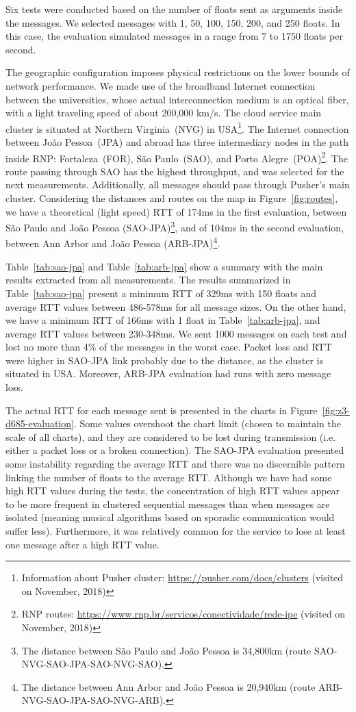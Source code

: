 Six tests were conducted based on the number of floats sent as arguments inside the messages.
We selected messages with 1, 50, 100, 150, 200, and 250 floats.
In this case, the evaluation simulated messages in a range from 7 to 1750 floats per second.

The geographic configuration imposes physical restrictions on the lower bounds of network performance.
We made use of the broadband Internet connection between the universities, whose actual interconnection medium is an optical fiber, with a light traveling speed of about 200,000 km/s.
The cloud service main cluster is situated at Northern Virginia~(NVG) in USA\footnote{Information about Pusher cluster: \url{https://pusher.com/docs/clusters} (visited on November, 2018)}.
The Internet connection between Jo\~{a}o Pessoa~(JPA) and abroad has three intermediary nodes in the path inside RNP: Fortaleza~(FOR), S\~{a}o Paulo~(SAO), and Porto Alegre~(POA)\footnote{RNP routes: \url{https://www.rnp.br/servicos/conectividade/rede-ipe} (visited on November, 2018)}.
The route passing through SAO has the highest throughput, and was selected for the next measurements.
Additionally, all messages should pass through Pusher's main cluster.
Considering the distances and routes on the map in Figure~\ref{fig:routes}, we have a theoretical (light speed) RTT of 174ms in the first evaluation, between S\~{a}o Paulo and Jo\~{a}o Pessoa (SAO-JPA)\footnote{The distance between S\~{a}o Paulo and Jo\~{a}o Pessoa is 34,800km (route SAO-NVG-SAO-JPA-SAO-NVG-SAO).}, and of 104ms in the second evaluation, between Ann Arbor and Jo\~{a}o Pessoa (ARB-JPA)\footnote{The distance between Ann Arbor and Jo\~{a}o Pessoa is 20,940km (route ARB-NVG-SAO-JPA-SAO-NVG-ARB).}.

Table~\ref{tab:sao-jpa} and Table~\ref{tab:arb-jpa} show a summary with the main results extracted from all measurements.
The results summarized in Table~\ref{tab:sao-jpa} present a minimum RTT of 329ms with 150 floats and average RTT values between 486-578ms for all message sizes.
On the other hand, we have a minimum RTT of 166ms with 1 float in Table~\ref{tab:arb-jpa}, and average RTT values between 230-348ms.
We sent 1000 messages on each test and lost no more than 4\% of the messages in the worst case.
Packet loss and RTT were higher in SAO-JPA link probably due to the distance, as the cluster is situated in USA.
Moreover, ARB-JPA evaluation had runs with zero message loss.

The actual RTT for each message sent is presented in the charts in Figure~\ref{fig:z3-d685-evaluation}.
Some values overshoot the chart limit (chosen to maintain the scale of all charts), and they are considered to be lost during transmission (i.e. either a packet loss or a broken connection). 
The SAO-JPA evaluation presented some instability regarding the average RTT and there was no discernible pattern linking the number of floats to the average RTT.
Although we have had some high RTT values during the tests, the concentration of high RTT values appear to be more frequent in clustered sequential messages than when messages are isolated (meaning musical algorithms based on sporadic communication would suffer less). Furthermore, it was relatively common for the service to lose at least one message after a high RTT value.

